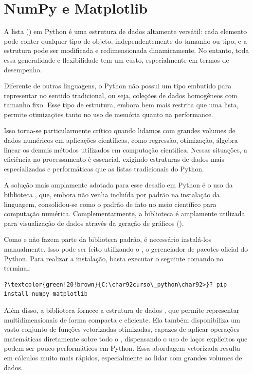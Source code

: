 \chapter{NumPy e Matplotlib}\label{numpy}

A lista () em Python é uma estrutura de dados altamente versátil: cada elemento pode conter qualquer tipo
de objeto, independentemente do tamanho ou tipo, e a estrutura pode ser modificada e redimensionada dinamicamente.
No entanto, toda essa generalidade e flexibilidade tem um custo, especialmente em termos de desempenho.

Diferente de outras linguagens, o Python não possui um tipo embutido para representar  no sentido
tradicional, ou seja, coleções de dados homogêneos com tamanho fixo.
Esse tipo de estrutura, embora bem mais restrita que uma lista, permite otimizações tanto no uso de memória quanto
na performance.

Isso torna-se particularmente crítico quando lidamos com grandes volumes de dados numéricos em aplicações
científicas, como regressão, otimização, álgebra linear os demais métodos utilizados em
computação científica.
Nessas situações, a eficiência no processamento é essencial, exigindo estruturas de dados mais especializadas e
performáticas que as listas tradicionais do Python.

A solução mais amplamente adotada para esse desafio em Python é o uso da biblioteca , que, embora não
venha incluída por padrão na instalação da linguagem, consolidou-se como o padrão de fato no meio científico para
computação numérica.
Complementarmente, a biblioteca  é amplamente utilizada para visualização de dados através da
geração de gráficos ().


Como  e  não fazem parte da biblioteca padrão, é necessário instalá-los manualmente.
Isso pode ser feito utilizando o , o gerenciador de pacotes oficial do Python.
Para realizar a instalação, basta executar o seguinte comando no terminal:
\begin{verbatim}
?\textcolor{green!20!brown}{C:\char92curso\_python\char92>}? pip install numpy matplotlib
\end{verbatim}

Além disso, a biblioteca  fornece a estrutura de dados , que permite representar
 multidimensionais de forma compacta e eficiente.
Ela também disponibiliza um vasto conjunto de funções vetorizadas otimizadas, capazes de aplicar operações matemáticas
diretamente sobre todo o , dispensando o uso de laços explícitos que podem ser pouco performáticos em Python.
Essa abordagem vetorizada resulta em cálculos muito mais rápidos, especialmente ao lidar com grandes volumes de dados.


